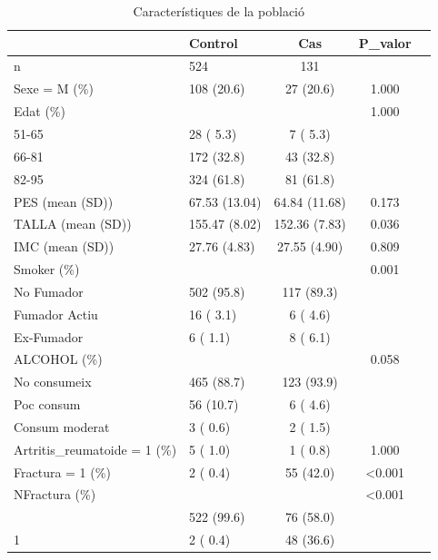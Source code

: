 \documentclass[
]{article}
\begin{document}
\begin{longtable}[t]{llccc}
\caption{\label{tab:unnamed-chunk-1}\label{tab:tab1}Característiques de la població}\\
\toprule
 & Control & Cas & P\_valor & \\
\midrule
n & 524 & 131 &  & \\
Sexe = M (\%) & 108 (20.6) & 27 (20.6) & 1.000 & \\
Edat (\%) &  &  & 1.000 & \\
\hspace{1em}51-65 & 28 ( 5.3) & 7 ( 5.3) &  & \\
\hspace{1em}66-81 & 172 (32.8) & 43 (32.8) &  & \\
\addlinespace
\hspace{1em}82-95 & 324 (61.8) & 81 (61.8) &  & \\
PES (mean (SD)) & 67.53 (13.04) & 64.84 (11.68) & 0.173 & \\
TALLA (mean (SD)) & 155.47 (8.02) & 152.36 (7.83) & 0.036 & \\
IMC (mean (SD)) & 27.76 (4.83) & 27.55 (4.90) & 0.809 & \\
Smoker (\%) &  &  & 0.001 & \\
\addlinespace
No Fumador & 502 (95.8) & 117 (89.3) &  & \\
\hspace{1em}Fumador Actiu & 16 ( 3.1) & 6 ( 4.6) &  & \\
\hspace{1em}Ex-Fumador & 6 ( 1.1) & 8 ( 6.1) &  & \\
\hspace{1em}ALCOHOL (\%) &  &  & 0.058 & \\
No consumeix & 465 (88.7) & 123 (93.9) &  & \\
\addlinespace
\hspace{1em}Poc consum & 56 (10.7) & 6 ( 4.6) &  & \\
\hspace{1em}Consum moderat & 3 ( 0.6) & 2 ( 1.5) &  & \\
\hspace{1em}Artritis\_reumatoide = 1 (\%) & 5 ( 1.0) & 1 ( 0.8) & 1.000 & \\
Fractura = 1 (\%) & 2 ( 0.4) & 55 (42.0) & <0.001 & \\
NFractura (\%) &  &  & <0.001 & \\
\addlinespace
0 & 522 (99.6) & 76 (58.0) &  & \\
\hspace{1em}1 & 2 ( 0.4) & 48 (36.6) &  & \\

\end{longtable}
\end{document}
